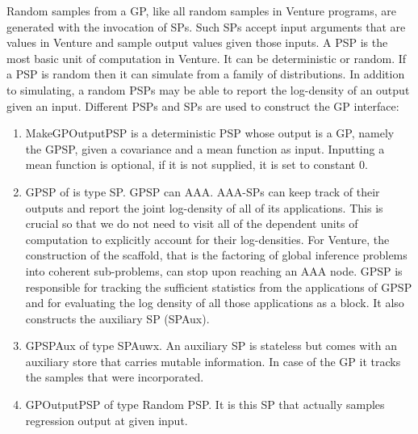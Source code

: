 Random samples from a \ac{GP}, like all random samples in Venture programs,
are generated with the invocation of \ac{SP}s.
Such \ac{SP}s accept input arguments that are values in Venture and sample output
values given those inputs. A \ac{PSP} is the most basic unit of computation in
Venture. It can be deterministic or random. If a \ac{PSP} is random then it can simulate from a family of
distributions. In addition to simulating,
a random PSPs may be able to report the log-density of an output given an input.
Different \ac{PSP}s and \ac{SP}s are used to construct the \ac{GP} interface:
\begin{enumerate}
\item MakeGPOutputPSP is a deterministic PSP whose output is a \ac{GP}, namely the
GPSP, given a
covariance and a mean function as input. Inputting a mean function is optional,
if it is not supplied, it is set to constant 0.
\item GPSP of is type SP\@. GPSP can \ac{AAA}\@. \ac{AAA}-\ac{SP}s can keep track of
their outputs and report
the joint log-density of all of its applications. This is crucial so that we do
not need to visit all of the dependent units of computation to explicitly account for their
log-densities. For Venture, the construction of the scaffold, that is the
factoring of global inference problems into coherent sub-problems, can stop upon
reaching an \ac{AAA} node. GPSP is responsible for tracking the sufficient statistics
from the applications of GPSP and for evaluating the log density of all those
applications as a block. It also constructs the auxiliary SP (SPAux).
\item GPSPAux of type SPAuwx. An auxiliary SP is stateless but comes with an auxiliary
store that carries mutable information. In case of the \ac{GP} it tracks the
samples that were incorporated.
\item GPOutputPSP of type Random PSP\@.  It is this SP that actually samples
regression output at given input.
\end{enumerate}






